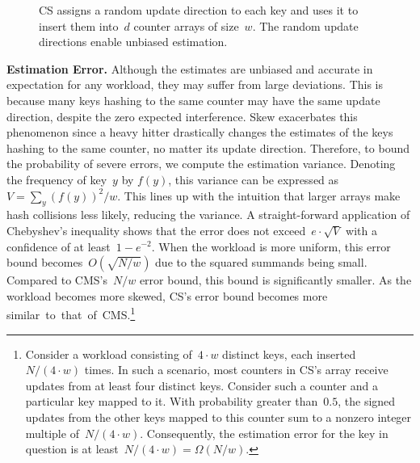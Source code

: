 \documentclass[sigconf]{acmart}
\begin{document}
\begin{figure}
    \caption{CS assigns a random update direction to each key and uses it to
    insert them into~$d$ counter arrays of size~$w$. The random update
    directions enable unbiased estimation.}
    \label{fig:cs_overview}
\end{figure}
\fi

\textbf{Estimation Error.}
Although the estimates are unbiased and accurate in expectation for any workload, they may suffer from large deviations.
This is because many keys hashing to the same counter may have the same update direction, despite the zero expected interference.
Skew exacerbates this phenomenon since a heavy hitter drastically changes the estimates of the keys hashing to the same counter, no matter its update direction.
Therefore, to bound the probability of severe errors, we compute the estimation variance.
Denoting the frequency of key~$y$ by $f(y)$, this variance can be expressed as~$V=\sum_y (f(y))^2/w$.
This lines up with the intuition that larger arrays make hash collisions less likely, reducing the variance.
A straight-forward application of Chebyshev's inequality shows that the error does not exceed~$e \cdot \sqrt{V}$ with a confidence of at least~$1-e^{-2}$.
When the workload is more uniform, this error bound becomes~$O(\sqrt{N/w})$ due to the squared summands being small.
Compared to CMS's~$N/w$ error bound, this bound is significantly smaller.
As the workload becomes more skewed, CS's error bound becomes more \mbox{similar to that of CMS}.\footnote{
    Consider a workload consisting of~$4 \cdot w$ distinct keys, each inserted~$N/(4 \cdot w)$ times.
    In such a scenario, most counters in CS's array receive updates from at least four distinct keys.
    Consider such a counter and a particular key mapped to it.
    With probability greater than~$0.5$, the signed updates from the other keys mapped to this counter sum to a nonzero integer multiple of~$N/(4 \cdot w)$.
    Consequently, the estimation error for the key in question is at least~$N/(4 \cdot w)=\Omega(N/w)$.
}
\end{document}
